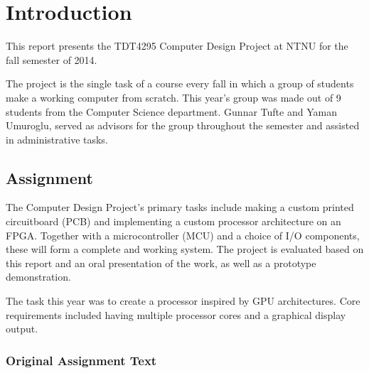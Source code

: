 \documentclass[../main/report.tex]{subfiles}
\begin{document}
\chapter{Introduction}
\label{sec:intro}

This report presents the TDT4295 Computer Design Project at NTNU for the fall semester of 2014.

The project is the single task of a course every fall in which a group of students make a working computer from scratch.
This year's group was made out of 9 students from the Computer Science department.
Gunnar Tufte and Yaman Umuroglu, served as advisors for the group throughout the semester and assisted in administrative tasks.

\section{Assignment}

The Computer Design Project's primary tasks include making a custom printed circuitboard (PCB) and  implementing a custom processor architecture on an FPGA.
Together with a microcontroller (MCU) and a choice of I/O components, these will form a complete and working system.
The project is evaluated based on this report and an oral presentation of the work, as well as a prototype demonstration.

The task this year was to create a processor inspired by GPU architectures.
Core requirements included having multiple processor cores and a graphical display output.

\newpage

\subsection{Original Assignment Text}
\end{document}
